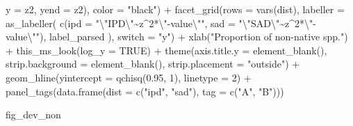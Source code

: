 \documentclass[
  letterpaper,
  DIV=11,
  numbers=noendperiod]{scrartcl}
\newenvironment{Shaded}{\begin{snugshade}}{\end{snugshade}}
\newcommand{\AttributeTok}[1]{\textcolor[rgb]{0.40,0.45,0.13}{#1}}
\newcommand{\ConstantTok}[1]{\textcolor[rgb]{0.56,0.35,0.01}{#1}}
\newcommand{\DecValTok}[1]{\textcolor[rgb]{0.68,0.00,0.00}{#1}}
\newcommand{\FloatTok}[1]{\textcolor[rgb]{0.68,0.00,0.00}{#1}}
\newcommand{\FunctionTok}[1]{\textcolor[rgb]{0.28,0.35,0.67}{#1}}
\newcommand{\NormalTok}[1]{\textcolor[rgb]{0.00,0.23,0.31}{#1}}
\newcommand{\SpecialCharTok}[1]{\textcolor[rgb]{0.37,0.37,0.37}{#1}}
\newcommand{\StringTok}[1]{\textcolor[rgb]{0.13,0.47,0.30}{#1}}
\begin{document}
\begin{Shaded}
\begin{Highlighting}[]
                            \AttributeTok{y =}\NormalTok{ z2, }
                            \AttributeTok{yend =}\NormalTok{ z2), }
              \AttributeTok{color =} \StringTok{"black"}\NormalTok{) }\SpecialCharTok{+}
    \FunctionTok{facet\_grid}\NormalTok{(}\AttributeTok{rows =} \FunctionTok{vars}\NormalTok{(dist), }
               \AttributeTok{labeller =} \FunctionTok{as\_labeller}\NormalTok{(}
                   \FunctionTok{c}\NormalTok{(}\AttributeTok{ipd =} \StringTok{"}\SpecialCharTok{\textbackslash{}"}\StringTok{IPD}\SpecialCharTok{\textbackslash{}"}\StringTok{\textasciitilde{}z\^{}2*}\SpecialCharTok{\textbackslash{}"}\StringTok{{-}value}\SpecialCharTok{\textbackslash{}"}\StringTok{"}\NormalTok{, }
                     \AttributeTok{sad =} \StringTok{"}\SpecialCharTok{\textbackslash{}"}\StringTok{SAD}\SpecialCharTok{\textbackslash{}"}\StringTok{\textasciitilde{}z\^{}2*}\SpecialCharTok{\textbackslash{}"}\StringTok{{-}value}\SpecialCharTok{\textbackslash{}"}\StringTok{"}\NormalTok{),}
\NormalTok{                   label\_parsed}
\NormalTok{               ), }
               \AttributeTok{switch =} \StringTok{"y"}\NormalTok{) }\SpecialCharTok{+}
    \FunctionTok{xlab}\NormalTok{(}\StringTok{"Proportion of non{-}native spp."}\NormalTok{) }\SpecialCharTok{+}
    \FunctionTok{this\_ms\_look}\NormalTok{(}\AttributeTok{log\_y =} \ConstantTok{TRUE}\NormalTok{) }\SpecialCharTok{+}
    \FunctionTok{theme}\NormalTok{(}\AttributeTok{axis.title.y =} \FunctionTok{element\_blank}\NormalTok{(),}
          \AttributeTok{strip.background =} \FunctionTok{element\_blank}\NormalTok{(), }
          \AttributeTok{strip.placement =} \StringTok{"outside"}\NormalTok{) }\SpecialCharTok{+}
    \FunctionTok{geom\_hline}\NormalTok{(}\AttributeTok{yintercept =} \FunctionTok{qchisq}\NormalTok{(}\FloatTok{0.95}\NormalTok{, }\DecValTok{1}\NormalTok{), }\AttributeTok{linetype =} \DecValTok{2}\NormalTok{) }\SpecialCharTok{+}
    \FunctionTok{panel\_tags}\NormalTok{(}\FunctionTok{data.frame}\NormalTok{(}\AttributeTok{dist =} \FunctionTok{c}\NormalTok{(}\StringTok{"ipd"}\NormalTok{, }\StringTok{"sad"}\NormalTok{), }\AttributeTok{tag =} \FunctionTok{c}\NormalTok{(}\StringTok{"A"}\NormalTok{, }\StringTok{"B"}\NormalTok{)))}



\NormalTok{fig\_dev\_non}
\end{Highlighting}
\end{Shaded}
\end{document}
